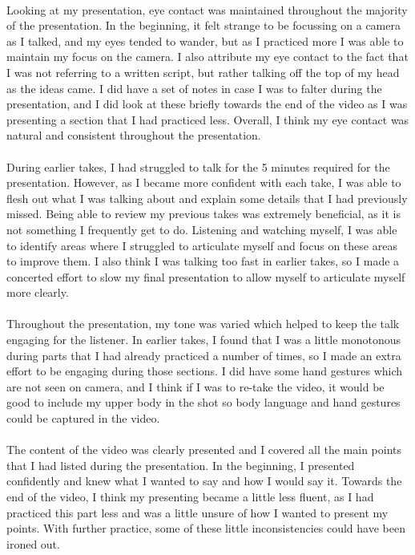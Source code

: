 \documentclass[11pt, a4paper]{article}
\begin{document}
	\paragraph{} {Looking at my presentation, eye contact was maintained throughout the majority of the presentation. In the beginning, it felt strange to be focussing on a camera as I talked, and my eyes tended to wander, but as I practiced more I was able to maintain my focus on the camera. I also attribute my eye contact to the fact that I was not referring to a written script, but rather talking off the top of my head as the ideas came. I did have a set of notes in case I was to falter during the presentation, and I did look at these briefly towards the end of the video as I was presenting a section that I had practiced less. Overall, I think my eye contact was natural and consistent throughout the presentation.}
	
	\paragraph{} {During earlier takes, I had struggled to talk for the 5 minutes required for the presentation. However, as I became more confident with each take, I was able to flesh out what I was talking about and explain some details that I had previously missed. Being able to review my previous takes was extremely beneficial, as it is not something I frequently get to do. Listening and watching myself, I was able to identify areas where I struggled to articulate myself and focus on these areas to improve them. I also think I was talking too fast in earlier takes, so I made a concerted effort to slow my final presentation to allow myself to articulate myself more clearly. }
	
	\paragraph{} {Throughout the presentation, my tone was varied which helped to keep the talk engaging for the listener. In earlier takes, I found that I was a little monotonous during parts that I had already practiced a number of times, so I made an extra effort to be engaging during those sections. I did have some hand gestures which are not seen on camera, and I think if I was to re-take the video, it would be good to include my upper body in the shot so body language and hand gestures could be captured in the video.}
	
	\paragraph{} {The content of the video was clearly presented and I covered all the main points that I had listed during the presentation. In the beginning, I presented confidently and knew what I wanted to say and how I would say it. Towards the end of the video, I think my presenting became a little less fluent, as I had practiced this part less and was a little unsure of how I wanted to present my points. With further practice, some of these little inconsistencies could have been ironed out. }
	
\end{document}
